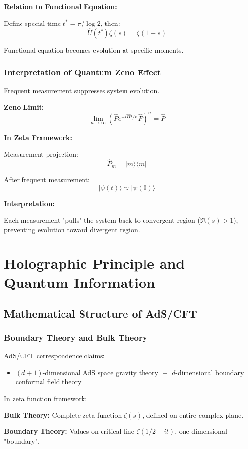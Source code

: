 \documentclass[11pt]{article}
\theoremstyle{plain}
\theoremstyle{definition}
\theoremstyle{remark}
\begin{document}
\textbf{Relation to Functional Equation:}

Define special time $t^* = \pi/\log 2$, then:
$$\hat{U}(t^*) \zeta(s) = \zeta(1-s)$$

Functional equation becomes evolution at specific moments.

\subsubsection{Interpretation of Quantum Zeno Effect}

Frequent measurement suppresses system evolution.

\textbf{Zeno Limit:}
$$\lim_{n \to \infty} \left( \hat{P} e^{-i\hat{H}t/n} \hat{P} \right)^n = \hat{P}$$

\textbf{In Zeta Framework:}

Measurement projection:
$$\hat{P}_m = |m\rangle\langle m|$$

After frequent measurement:
$$|\psi(t)\rangle \approx |\psi(0)\rangle$$

\textbf{Interpretation:}

Each measurement "pulls" the system back to convergent region ($\Re(s) > 1$), preventing evolution toward divergent region.

\section{Holographic Principle and Quantum Information}

\subsection{Mathematical Structure of AdS/CFT}

\subsubsection{Boundary Theory and Bulk Theory}

AdS/CFT correspondence claims:
\begin{itemize}
\item $(d+1)$-dimensional AdS space gravity theory $\equiv$ $d$-dimensional boundary conformal field theory
\end{itemize}

In zeta function framework:

\textbf{Bulk Theory:} Complete zeta function $\zeta(s)$, defined on entire complex plane.

\textbf{Boundary Theory:} Values on critical line $\zeta(1/2 + it)$, one-dimensional "boundary".
\end{document}
